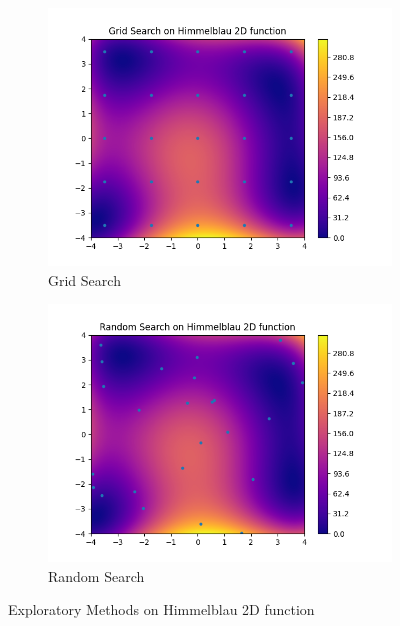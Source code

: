 \begin{figure}[h]
    \centering
    \begin{subfigure}{.5\textwidth}
      \centering
      \includegraphics[width=\linewidth]{assets/img/chap_2/plots/grid_search.png}
      \caption{Grid Search}
      \label{fig:grid_search}
    \end{subfigure}%
    \begin{subfigure}{.5\textwidth}
      \centering
      \includegraphics[width=\linewidth]{assets/img/chap_2/plots/random_search.png}
      \caption{Random Search}
      \label{fig:random_search}
    \end{subfigure}
    \caption{Exploratory Methods on Himmelblau 2D function}
    \label{fig:exploratory}
    \end{figure}

